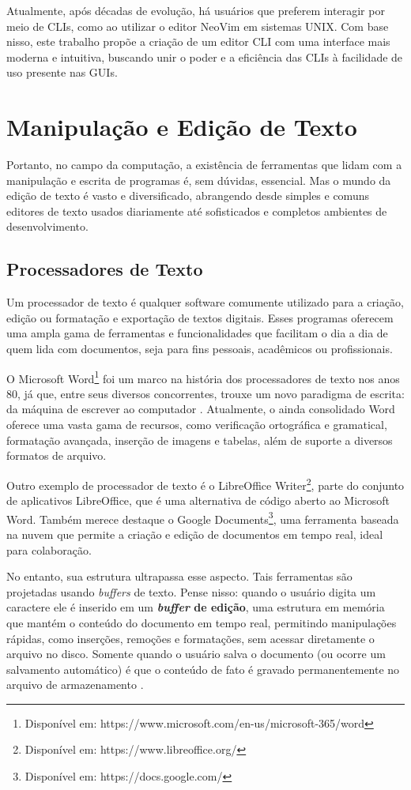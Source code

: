 Atualmente, após décadas de evolução, há usuários que preferem interagir por meio
de CLIs, como ao utilizar o editor NeoVim em sistemas UNIX. Com base nisso, este
trabalho propõe a criação de um editor CLI com uma interface mais moderna e
intuitiva, buscando unir o poder e a eficiência das CLIs à facilidade de uso presente
nas GUIs.

\section{Manipulação e Edição de Texto}

Portanto, no campo da computação, a existência de ferramentas que lidam com a
manipulação e escrita de programas é, sem dúvidas, essencial. Mas o mundo da edição
de texto é vasto e diversificado, abrangendo desde simples e comuns editores de
texto usados diariamente até sofisticados e completos ambientes de
desenvolvimento.

\subsection{Processadores de Texto}

Um processador de texto é qualquer software comumente utilizado para a
criação, edição ou formatação e exportação de textos digitais. Esses programas
oferecem uma ampla gama de ferramentas e funcionalidades que facilitam o dia a
dia de quem lida com documentos, seja para fins pessoais, acadêmicos ou
profissionais.

O Microsoft Word\footnote{Disponível em: https://www.microsoft.com/en-us/microsoft-365/word}
foi um marco na história dos processadores de texto nos anos 80, já que, entre seus
diversos concorrentes, trouxe um novo paradigma de escrita: da máquina de escrever
ao computador \cite{inbook}. Atualmente, o ainda consolidado Word oferece uma vasta
gama de recursos, como verificação ortográfica e gramatical, formatação avançada,
inserção de imagens e tabelas, além de suporte a diversos formatos de arquivo.

Outro exemplo de processador de texto é o LibreOffice Writer\footnote{Disponível
em: https://www.libreoffice.org/}, parte do conjunto de aplicativos LibreOffice,
que é uma alternativa de código aberto ao Microsoft Word. Também merece destaque
o Google Documents\footnote{Disponível em: https://docs.google.com/}, uma ferramenta
baseada na nuvem que permite a criação e edição de documentos em tempo real,
ideal para colaboração.

No entanto, sua estrutura ultrapassa esse aspecto. Tais ferramentas são projetadas usando \textit{buffers}
de texto. Pense nisso: quando o usuário digita um caractere ele é inserido em um
\textbf{\textit{buffer} de edição}, uma estrutura em memória que mantém o
conteúdo do documento em tempo real, permitindo manipulações rápidas, como
inserções, remoções e formatações, sem acessar diretamente o arquivo no disco. Somente
quando o usuário salva o documento (ou ocorre um salvamento automático) é que o conteúdo
de fato é gravado permanentemente no arquivo de armazenamento \cite{Jacobson1989}.

